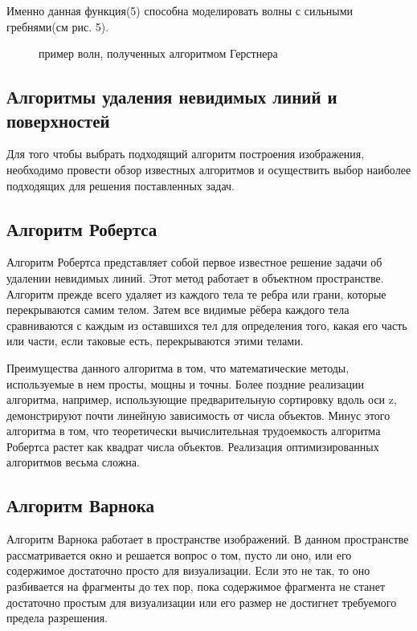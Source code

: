 Именно данная функция(5) способна моделировать волны с сильными гребнями(см рис. 5).

\begin{figure}[h]
	\caption{пример волн, полученных алгоритмом Герстнера}
\end{figure}

\subsection{Алгоритмы удаления невидимых линий и поверхностей}

Для того чтобы выбрать подходящий алгоритм построения изображения, необходимо провести обзор известных алгоритмов и осуществить выбор наиболее подходящих для решения поставленных задач.

\subsection*{Алгоритм Робертса}

Алгоритм Робертса представляет собой первое известное решение задачи об удалении невидимых линий. Этот метод работает в объектном пространстве. Алгоритм прежде всего удаляет из каждого тела те ребра или грани, которые перекрываются самим телом. Затем все видимые рёбера каждого тела сравниваются с каждым из оставшихся тел для определения того, какая его часть или части, если таковые есть, перекрываются этими телами.
 
Преимущества данного алгоритма в том, что математические методы, используемые в нем просты, мощны и точны. Более поздние реализации алгоритма, например, использующие предварительную сортировку вдоль оси z, демонстрируют почти линейную зависимость от числа объектов.
Минус этого алгоритма в том, что теоретически вычислительная трудоемкость алгоритма Робертса растет как квадрат числа объектов. Реализация оптимизированных алгоритмов весьма сложна.

\subsection*{Алгоритм Варнока}
Алгоритм Варнока работает в пространстве изображений. В данном пространстве рассматривается окно и решается вопрос о том, пусто ли оно, или его содержимое достаточно просто для визуализации. Если это не так, то оно разбивается на фрагменты до тех пор, пока содержимое фрагмента не станет достаточно простым для визуализации или его размер не достигнет требуемого предела разрешения.
 
